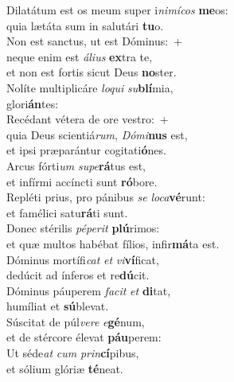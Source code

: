 \evenverse Dilatátum est os meum super i\textit{ni}\textit{mí}\textit{cos} \textbf{me}os:~\*\\
\evenverse quia lætáta sum in salutári \textbf{tu}o.\\
\oddverse Non est sanctus, ut est Dóminus:~+\\
\oddverse  neque enim est \textit{á}\textit{li}\textit{us} \textbf{ex}tra te,~\*\\
\oddverse et non est fortis sicut Deus \textbf{no}ster.\\
\evenverse Nolíte multiplicáre \textit{lo}\textit{qui} \textit{su}\textbf{blí}mia,~\*\\
\evenverse glori\textbf{án}tes:\\
\oddverse Recédant vétera de ore vestro:~+\\
\oddverse  quia Deus scientiá\textit{rum}, \textit{Dó}\textit{mi}\textbf{nus} est,~\*\\
\oddverse et ipsi præparántur cogitati\textbf{ó}nes.\\
\evenverse Arcus fórti\textit{um} \textit{su}\textit{pe}\textbf{rá}tus est,~\*\\
\evenverse et infírmi accíncti sunt \textbf{ró}bore.\\
\oddverse Repléti prius, pro pánibus \textit{se} \textit{lo}\textit{ca}\textbf{vé}runt:~\*\\
\oddverse et famélici satu\textbf{rá}ti sunt.\\
\evenverse Donec stérilis \textit{pé}\textit{pe}\textit{rit} \textbf{plú}rimos:~\*\\
\evenverse et quæ multos habébat fílios, infir\textbf{má}ta est.\\
\oddverse Dóminus mortífi\textit{cat} \textit{et} \textit{vi}\textbf{ví}ficat,~\*\\
\oddverse dedúcit ad ínferos et re\textbf{dú}cit.\\
\evenverse Dóminus páuperem \textit{fa}\textit{cit} \textit{et} \textbf{di}tat,~\*\\
\evenverse humíliat et \textbf{sú}blevat.\\
\oddverse Súscitat de púl\textit{ve}\textit{re} \textit{e}\textbf{gé}num,~\*\\
\oddverse et de stércore élevat \textbf{páu}perem:\\
\evenverse Ut séde\textit{at} \textit{cum} \textit{prin}\textbf{cí}pibus,~\*\\
\evenverse et sólium glóriæ \textbf{té}neat.\\
